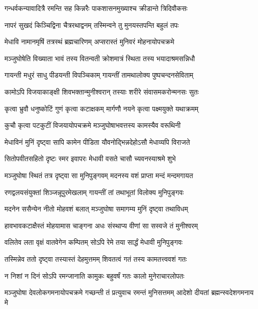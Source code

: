 \twolineshloka
{गन्धर्वकन्यावादित्रै रमन्ति सह किन्नरैः}
{पाकशासनमुख्याश्च क्रीडान्ते त्रिदिवौकसः}%

\twolineshloka
{नापरं सुखदं किञ्चिद्विना चैत्ररथाद्वनम्}
{तस्मिन्वने तु मुनयस्तपन्ति बहुलं तपः}%

\twolineshloka
{मेधावि नामानमृषिं तत्रस्थं ब्रह्मचारिणम्}
{अप्सरास्तं मुनिवरं मोहनायोपचक्रमे}%

\twolineshloka
{मञ्जुघोषेति विख्याता भावं तस्य वितन्वती}
{क्रोशमात्रं स्थिता तस्य भयादाश्रमसन्निधौ}%

\twolineshloka
{गायन्ती मधुरं साधु पीडयन्ती विपञ्चिकाम्}
{गायन्तीं तामथालोक्य पुष्पचन्दनसेविताम्}%

\twolineshloka
{कामोऽपि विजयाकाङ्क्षी शिवभक्तान्मुनीश्वरान्}
{तस्याः शरीरे संवासमकरोन्मनसः सुतः}%

\twolineshloka
{कृत्वा भ्रुवौ धनुष्कोटिं गुणं कृत्वा कटाक्षकम्}
{मार्गणौ नयने कृत्वा पक्ष्मयुक्ते यथाक्रमम्}%

\twolineshloka
{कुचौ कृत्वा पटकुटीं विजयायोपचक्रमे}
{मञ्जुघोषाभवत्तस्य कामस्यैव वरूथिनी}%

\twolineshloka
{मेधाविनं मुनिं दृष्ट्वा सापि कामेन पीडिता}
{यौवनोद्भिन्नदेहोऽसौ मेधाव्यपि विराजते}%

\twolineshloka
{सितोपवीतसहितो दृष्टः स्मर इवापरः}
{मेधावी वसते चासौ च्यवनस्याश्रमे शुभे}%

\twolineshloka
{मञ्जुघोषा स्थितं तत्र दृष्ट्वा सा मुनिपुङ्गवम्}
{मदनस्य वशं प्राप्ता मन्दं मन्दमगायत}%

\twolineshloka
{रणद्वलयसंयुक्तां शिञ्जन्नूपुरमेखलाम्}
{गायन्तीं तां तथाभूतां विलोक्य मुनिपुङ्गवः}%

\twolineshloka
{मदनेन ससैन्येन नीतो मोहवशं बलात्}
{मञ्जुघोषा समागम्य मुनिं दृष्ट्वा तथाविधम्}%

\twolineshloka
{हावभावकटाक्षैस्तं मोहयामास चाङ्गना}
{अधः संस्थाप्य वीणां सा सस्वजे तं मुनीश्वरम्}%

\twolineshloka
{वलितेव लता वृक्षं वातवेगेन कम्पितम्}
{सोऽपि रेमे तया सार्द्धं मेधावी मुनिपुङ्गवः}%

\twolineshloka
{तस्मिन्नेव ततो दृष्ट्वा तस्यास्तं देहमुत्तमम्}
{शिवतत्वं गतं तस्य कामतत्त्ववशं गतः}%

\twolineshloka
{न निशां न दिनं सोऽपि रमन्जानाति कामुकः}
{बहुवर्षं गतः कालो मुनेराचारलोपतः}%

\threelineshloka
{मञ्जुघोषा देवलोकगमनायोपचक्रमे}
{गच्छन्ती तं प्रत्युवाच रमन्तं मुनिसत्तमम्}
{आदेशो दीयतां ब्रह्मन्स्वदेशगमनाय मे}%

